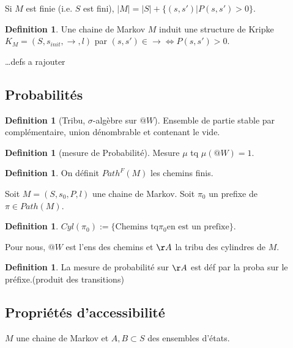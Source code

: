 \documentclass[12pt]{article}
\theoremstyle{plain}
\theoremstyle{definition}
\newtheorem{defn}[subsubsection]{Definition}
\theoremstyle{remark}
\begin{document}
Si $M$ est finie (i.e. $S$ est fini), $|M|=|S|+\{(s,s')| P(s,s')>0\}$. 

\begin{defn}
    Une chaine de Markov $M$ induit une structure de Kripke $K_{M}=(S, s_{init}, \to,l)$ par 
    $(s,s')\in\to\Leftrightarrow P(s,s')>0$.
\end{defn}

\ldots defs a rajouter 

\subsection{Probabilités}
\begin{defn}[Tribu, $\sigma$-algèbre sur $@W$]
    Ensemble de partie stable par complémentaire, union dénombrable et contenant le vide.
\end{defn}

\begin{defn}[mesure de Probabilité]
    Mesure $\mu$ tq $\mu(@W)=1$.
\end{defn}

\begin{defn}
    On définit $Path^F(M)$ les chemins finis.
\end{defn}

Soit $M=(S,s_0, P, l)$ une chaine de Markov. Soit $\pi_0$ un prefixe de $\pi\in Path(M)$. 

\begin{defn}
    $Cyl(\pi_0):=\{\text{Chemins tq} \pi_0\text{en est un prefixe}\}$.
\end{defn}

Pour nous, $@W$ est l'ens des chemins et $\AA$ la tribu des cylindres de $M$.
\begin{defn}
    La mesure de probabilité sur $\AA$ est déf par la proba sur le préfixe.(produit des transitions)
\end{defn}

\subsection{Propriétés d'accessibilité}
$M$ une chaine de Markov et $A,B\subset S$ des ensembles d'états.
\end{document}
